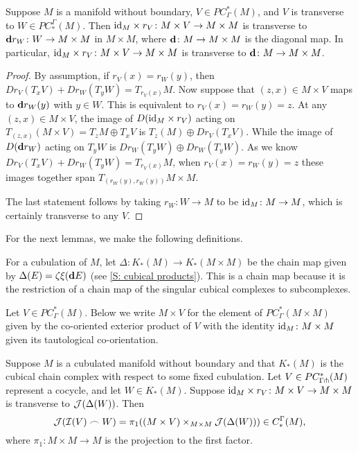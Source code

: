 \begin{lemma}\label{L: M times transverse diag}
	Suppose $M$ is a manifold without boundary, $V \in PC^*_{\Gamma}(M)$, and $V$ is transverse to $W \in PC_*^\Gamma(M)$.
	Then $\mathrm{id}_M \times r_V \colon M \times V \to M \times M$ is transverse to $\mathbf{d} r_W \colon W \to M \times M$ in $M \times M$, where $\mathbf{d} \colon M \to M \times M$ is the diagonal map.
	In particular, $\mathrm{id}_M \times r_V \colon M \times V \to M \times M$ is transverse to $\mathbf{d} \colon M \to M \times M$.
\end{lemma}

\begin{proof}
	By assumption, if $r_V(x) = r_W(y)$, then $Dr_V(T_xV)+Dr_W(T_yW) = T_{r_V(x)}M$.
	Now suppose that $(z,x) \in M \times V$ maps to $\mathbf{d} r_W(y)$ with $y \in W$.
	This is equivalent to $r_V(x) = r_W(y) = z$.
	At any $(z,x) \in M \times V$, the image of $D(\mathrm{id}_M \times r_V)$ acting on $T_{(z,x)}(M \times V) = T_zM \oplus T_xV$ is $T_z(M) \oplus Dr_V(T_xV)$.
	While the image of $D(\mathbf{d} r_W)$ acting on $T_yW$ is $Dr_W(T_yW) \oplus Dr_W(T_yW)$.
	As we know $Dr_V(T_xV)+Dr_W(T_yW) = T_{r_V(x)}M$, when $r_V(x) = r_W(y) = z$ these images together span $T_{(r_W(y),r_W(y))}M \times M$.

	The last statement follows by taking $r_W \colon W \to M$ to be $\mathrm{id}_M \colon M \to M$, which is certainly transverse to any $V$.
\end{proof}

For the next lemmas, we make the following definitions.

\begin{definition}
	For a cubulation of $M$, let $\Delta:K_*(M) \to K_*(M \times M)$ be the chain map given by $\Delta(E) = \zeta\xi(\mathbf{d} E)$ (see \cref{S: cubical products}).
	This is a chain map because it is the restriction of a chain map of the singular cubical complexes to subcomplexes.
\end{definition}

\begin{definition}
	Let $V \in PC^*_\Gamma(M)$.
	Below we write $M \times V$ for the element of $PC^*_\Gamma(M \times M)$ given by the co-oriented exterior product of $V$ with the identity $\mathrm{id}_M \colon M \times M$ given its tautological co-orientation.
\end{definition}

\begin{lemma}\label{L: image of cubical cap}
	Suppose $M$ is a cubulated manifold without boundary and that $K_*(M)$ is the cubical chain complex with respect to some fixed cubulation.
	Let $V \in PC^*_{\Gamma\pitchfork}(M)$ represent a cocycle, and let $W \in K_*(M)$.
	Suppose $\mathrm{id}_M \times r_V \colon M \times V \to M \times M$ is transverse to $\mathcal{J}(\Delta(W))$.
	Then $$\mathcal{J}(\mathcal{I}(V)\frown W) = \pi_1( (M \times V)\times_{M \times M}\mathcal{J}(\Delta(W))) \in C_*^\Gamma(M),$$
	where $\pi_1 \colon M \times M \to M$ is the projection to the first factor.
\end{lemma}

